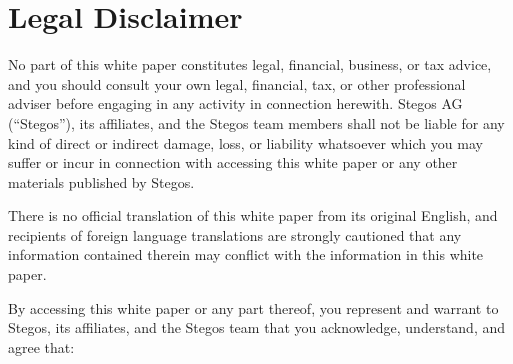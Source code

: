 \documentclass[8pt,fleqn,openany]{book}
\begin{document}
\chapter{Legal Disclaimer}

No part of this white paper constitutes legal, financial, business, or tax advice, and you should consult your own legal, financial, tax, or other professional adviser before engaging in any activity in connection herewith. Stegos AG (“Stegos”), its affiliates, and the Stegos team members shall not be liable for any kind of direct or indirect damage, loss, or liability whatsoever which you may suffer or incur in connection with accessing this white paper or any other materials published by Stegos. 

There is no official translation of this white paper from its original English, and recipients of foreign language translations are strongly cautioned that any information contained therein may conflict with the information in this white paper. 

By accessing this white paper or any part thereof, you represent and warrant to Stegos, its affiliates, and the Stegos team that you acknowledge, understand, and agree that: 
\end{document}
